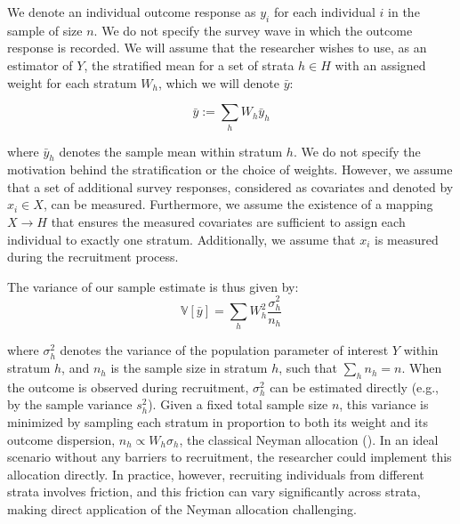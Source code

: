 \documentclass[letterpaper,12pt]{article}
\theoremstyle{proposition}
\begin{document}
We denote an individual outcome response as $y_i$ for each individual $i$ in the sample of size $n$. We do not specify the survey wave in which the outcome response is recorded. We will assume that the researcher wishes to use, as an estimator of $Y$, the stratified mean for a set of strata $h \in H$ with an assigned weight for each stratum $W_h$, which we will denote $\bar{y}$:

$$
\bar{y} := \sum_h W_h\bar{y}_h
$$

where $\bar{y}_h$ denotes the sample mean within stratum $h$. We do not specify the motivation behind the stratification or the choice of weights. However, we assume that a set of additional survey responses, considered as covariates and denoted by \( x_i \in X \), can be measured. Furthermore, we assume the existence of a mapping \( X \rightarrow H \) that ensures the measured covariates are sufficient to assign each individual to exactly one stratum. Additionally, we assume that \( x_i \) is measured during the recruitment process.








The variance of our sample estimate is thus given by:
$$
\mathbb{V}[\bar{y}] =  \sum_{h}  W_h^2 \frac{\sigma_h^2}{n_h}
$$


where $\sigma_h^2$ denotes the variance of the population parameter of interest $Y$ within stratum $h$, and $n_h$ is the sample size in stratum $h$, such that $\sum_h n_h = n$. When the outcome is observed during recruitment, $\sigma_h^2$ can be estimated directly (e.g., by the sample variance $s_h^2$). Given a fixed total sample size $n$, this variance is minimized by sampling each stratum in proportion to both its weight and its outcome dispersion, $n_h \propto W_h \sigma_h$, the classical Neyman allocation (\citealt{Neyman1934,Groves2010}). In an ideal scenario without any barriers to recruitment, the researcher could implement this allocation directly. In practice, however, recruiting individuals from different strata involves friction, and this friction can vary significantly across strata, making direct application of the Neyman allocation challenging.
\end{document}

